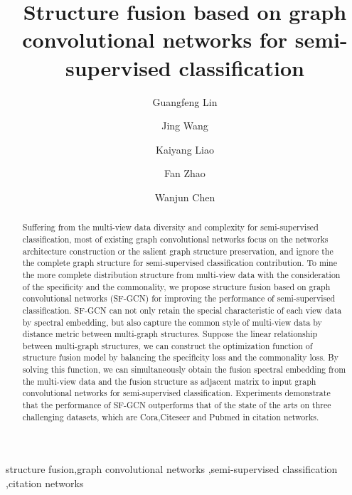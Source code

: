 \documentclass[review]{elsarticle}
\begin{document}
\begin{frontmatter}

\title{Structure fusion based on graph convolutional networks for semi-supervised classification}

\author[mymainaddress]{Guangfeng Lin}


\author[mymainaddress]{Jing Wang}
\author[mymainaddress]{Kaiyang Liao}
\author[mymainaddress]{Fan Zhao}
\author[mymainaddress]{Wanjun Chen}




\address[mymainaddress]{Information Science Department, Xi'an University of Technology,\\
 5 South Jinhua Road, Xi'an, Shaanxi Province 710048, PR China}



\begin{abstract}
Suffering from the multi-view data diversity and complexity for semi-supervised classification, most of existing graph convolutional networks focus on the networks architecture construction or the salient graph structure preservation, and ignore the the complete graph structure for semi-supervised classification contribution. To mine the more complete distribution structure from multi-view data with the consideration of the specificity and the commonality, we propose structure fusion based on graph convolutional networks (SF-GCN) for improving the performance of semi-supervised classification. SF-GCN can not only retain the special characteristic of each view data by spectral embedding, but also capture the common style of multi-view data by distance metric between multi-graph structures. Suppose the linear relationship between multi-graph structures, we can construct the optimization function of structure fusion model by balancing the specificity loss and the commonality loss. By solving this function, we can simultaneously obtain the fusion spectral embedding from the multi-view data and the fusion structure as adjacent matrix to input graph convolutional networks for semi-supervised classification. Experiments demonstrate that the performance of SF-GCN outperforms that of the state of the arts on three challenging datasets, which are Cora,Citeseer and Pubmed in citation networks.
\end{abstract}

\begin{keyword}
structure fusion\sep graph convolutional networks \sep semi-supervised classification \sep citation networks
\end{keyword}

\end{frontmatter}
\end{document}
